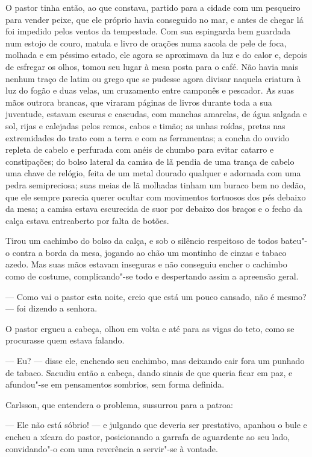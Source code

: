 O pastor tinha então, ao que constava, partido para a cidade com um pesqueiro
para vender peixe, que ele próprio havia conseguido no mar, e antes de chegar lá
foi impedido pelos ventos da tempestade. Com sua espingarda bem guardada num
estojo de couro, matula e livro de orações numa sacola de pele de foca, molhada
e em péssimo estado, ele agora se aproximava da luz e do calor e, depois de esfregar
os olhos, tomou seu lugar à mesa posta para o café. Não havia mais nenhum traço
de latim ou grego que se pudesse agora divisar naquela criatura à luz do fogão e
duas velas, um cruzamento entre camponês e pescador. As suas mãos outrora
brancas, que viraram páginas de livros durante toda a sua juventude, estavam
escuras e cascudas, com manchas amarelas, de água salgada e sol, rijas e
calejadas pelos remos, cabos e timão; as unhas roídas, pretas nas extremidades
do trato com a terra e com as ferramentas; a concha do ouvido repleta de cabelo
e perfurada com anéis de chumbo para evitar catarro e constipações; do bolso
lateral da camisa de lã pendia de uma trança de cabelo uma chave de relógio,
feita de um metal dourado qualquer e adornada com uma pedra semipreciosa; suas
meias de lã molhadas tinham um buraco bem no dedão, que ele sempre parecia
querer ocultar com movimentos tortuosos dos pés debaixo da mesa; a camisa estava
escurecida de suor por debaixo dos braços e o fecho da calça estava entreaberto
por falta de botões.

Tirou um cachimbo do bolso da calça, e sob o silêncio respeitoso de todos
bateu"-o contra a borda da mesa, jogando ao chão um montinho de cinzas e tabaco
azedo. Mas suas mãos estavam inseguras e não conseguiu encher o cachimbo como de
costume, complicando"-se todo e despertando assim a apreensão geral.

--- Como vai o pastor esta noite, creio que está um pouco cansado, não é mesmo?
--- foi dizendo a senhora.

O pastor ergueu a cabeça, olhou em volta e até para as vigas do teto, como se
procurasse quem estava falando.

--- Eu? --- disse ele, enchendo seu cachimbo, mas deixando cair fora um punhado de
tabaco. Sacudiu então a cabeça, dando sinais de que queria ficar em paz, e
afundou"-se em pensamentos sombrios, sem forma definida.

Carlsson, que entendera o problema, sussurrou para a patroa:

--- Ele não está sóbrio! --- e julgando que deveria ser prestativo, apanhou o bule
e encheu a xícara do pastor, posicionando a garrafa de aguardente ao seu lado,
convidando"-o com uma reverência a servir"-se à vontade.

